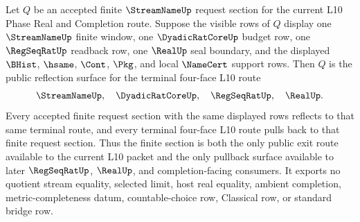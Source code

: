 \begin{theorem}
\label{thm:streamname-finite-request-section-terminal-reflection}
Let $Q$ be an accepted finite $\StreamNameUp$ request section for the current
L10 Phase Real and Completion route. Suppose the visible rows of $Q$ display
one $\StreamNameUp$ finite window, one $\DyadicRatCoreUp$ budget row, one
$\RegSeqRatUp$ readback row, one $\RealUp$ seal boundary, and the displayed
$\BHist$, $\hsame$, $\Cont$, $\Pkg$, and local $\NameCert$ support rows. Then
$Q$ is the public reflection surface for the terminal four-face L10 route
$$
\StreamNameUp,\quad \DyadicRatCoreUp,\quad \RegSeqRatUp,\quad \RealUp.
$$
Every accepted finite request section with the same displayed rows reflects to
that same terminal route, and every terminal four-face L10 route pulls back to
that finite request section. Thus the finite section is both the only public
exit route available to the current L10 packet and the only pullback surface
available to later $\RegSeqRatUp$, $\RealUp$, and completion-facing consumers.
It exports no quotient stream equality, selected limit, host real equality,
ambient completion, metric-completeness datum, countable-choice row,
Classical row, or standard bridge row.
\end{theorem}
